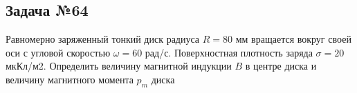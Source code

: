 \subsection{Задача №64}

 Равномерно заряженный тонкий диск радиуса $R = 80$ мм вращается вокруг своей оси с угловой скоростью $\omega = 60$ рад/с. Поверхностная плотность заряда $\sigma = 20$ мкКл/м2. Определить величину магнитной индукции $B$ в центре диска и величину магнитного момента $p_m$ диска